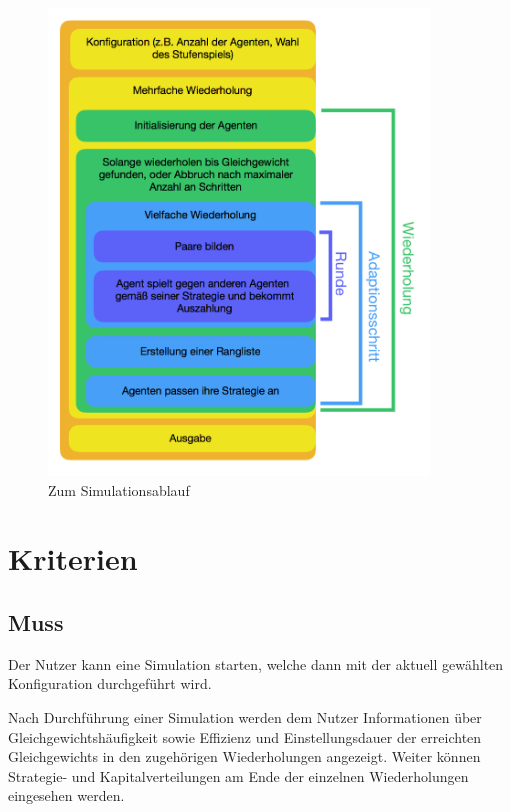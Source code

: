 \documentclass[parskip=full,11pt]{scrartcl}
\begin{document}
\begin{figure}
	\centering
	\includegraphics[width=0.9\textwidth]{images/Schema.png}
	\caption{\label{fig:schema}
		Zum Simulationsablauf}
\end{figure}

\pagebreak
\section{Kriterien}

\subsection{Muss}


Der \Gls{Nutzer} kann eine Simulation starten, welche dann mit der aktuell gewählten \Gls{Konfiguration} durchgeführt wird.


Nach Durchführung einer Simulation werden dem \Gls{Nutzer} Informationen über Gleichgewichtshäufigkeit sowie \Gls{Effizienz} und \Gls{Einstellungsdauer} der erreichten \Glspl{Gleichgewicht} in den zugehörigen Wiederholungen angezeigt. Weiter können Strategie- und Kapitalverteilungen am Ende der einzelnen Wiederholungen eingesehen werden.
\end{document}
